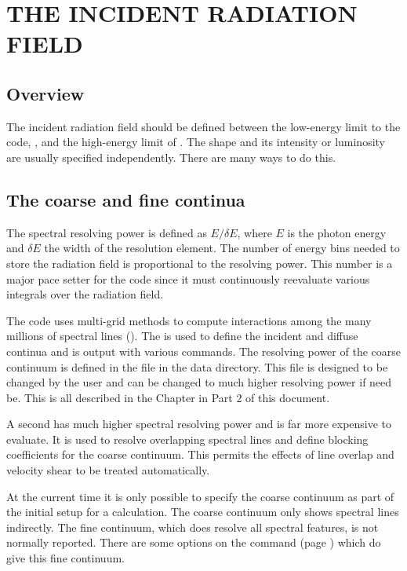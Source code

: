 \chapter{THE INCIDENT RADIATION FIELD}

\section{Overview}

The incident radiation field should be defined between the low-energy limit
to the code, \emm ,
and the high-energy limit of \egamry .
The shape and its intensity or luminosity are usually specified
independently.
There are many ways to do this.

\section{The coarse and fine continua}

The spectral resolving power is defined as $E/\delta E$, where $E$ is the
photon energy and $\delta E$ the width of the resolution element.  The number
of energy bins needed to store the radiation field is proportional to the
resolving power.  This number is a major pace setter for the code since it
must continuously reevaluate various integrals over the radiation field.

The code uses multi-grid methods to compute interactions among the
many millions of spectral lines (\citealp{Shaw2005}).  The
 is used to define the
incident and diffuse continua and
is output with various  commands.
The resolving power of the
coarse continuum is defined in the file 
in the data directory.
This file is designed to be changed by the user and can be
changed to much higher resolving power if need be.  This is all described in
the Chapter  in Part 2 of this document.

A second  has much higher spectral resolving power and
is far more expensive to evaluate.
It is used to resolve overlapping spectral
lines and define blocking coefficients for the coarse continuum.  This
permits the effects of line overlap and velocity shear to be treated
automatically.

At the current time it is only possible to specify the coarse
continuum as part of the initial setup for a calculation.
The coarse continuum only shows spectral lines indirectly.
The fine continuum, which does resolve all spectral features,
is not normally reported.
There are some options
on the  command 
(page \pageref{sec:CommandSaveContinuum}) which do give
this fine continuum.

